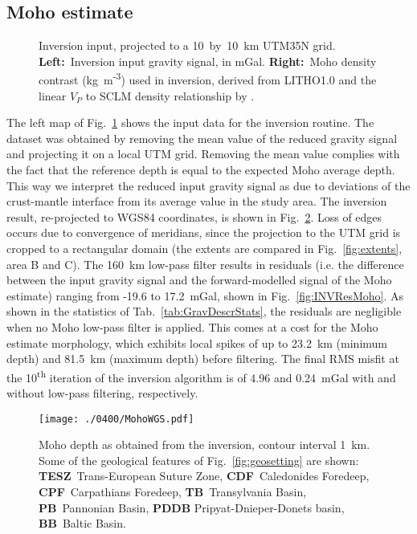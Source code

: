 {\subsection{Moho estimate}
\label{ss:Appl:DiscGravMoho}

\begin{figure}
	\begin{adjustbox}{center}
	\end{adjustbox}
	\caption{Inversion input, projected to a 10~by~10~km UTM35N grid. \textbf{Left:}~Inversion input gravity signal, in mGal. \textbf{Right:}~Moho density contrast (kg~m\textsuperscript{-3}) used in inversion, derived from {LITHO1.0} \parencite{Pasyanos2014} and the linear $V_P$ to SCLM density relationship by \textcite{Yegorova2015}.}
	\label{fig:INVinput}
\end{figure}

The left map of Fig.~\ref{fig:INVinput} shows the input data for the inversion routine.
The dataset was obtained by removing the mean value of the reduced gravity signal and projecting it on a local UTM grid.
Removing the mean value complies with the fact that the reference depth is equal to the expected Moho average depth.
This way we interpret the reduced input gravity signal as due to deviations of the crust-mantle interface from its average value in the study area.
The inversion result, re-projected to WGS84 coordinates, is shown in Fig.~\ref{fig:INVMoho}.
Loss of edges occurs due to convergence of meridians, since the projection to the UTM grid is cropped to a rectangular domain (the extents are compared in Fig.~\ref{fig:extents}, area B and C).
The 160~km low-pass filter results in residuals (i.e. the difference between the input gravity signal and the forward-modelled signal of the Moho estimate) ranging from -19.6 to 17.2~mGal, shown in Fig.~\ref{fig:INVResMoho}.
As shown in the statistics of Tab.~\ref{tab:GravDescrStats}, the residuals are negligible when no Moho low-pass filter is applied.
This comes at a cost for the Moho estimate morphology, which exhibits local spikes of up to 23.2~km (minimum depth) and 81.5~km (maximum depth) before filtering.
The final RMS misfit at the 10\textsuperscript{th} iteration of the inversion algorithm is of 4.96 and 0.24~mGal with and without low-pass filtering, respectively.

\begin{figure}
	\begin{adjustbox}{center}
	\texttt{[image: ./0400/MohoWGS.pdf]}
	\end{adjustbox}
	\caption{Moho depth as obtained from the inversion, contour interval 1~km. Some of the geological features of Fig.~\ref{fig:geosetting} are shown: \textbf{TESZ}~Trans-European Suture Zone, \textbf{CDF}~Caledonides Foredeep, \textbf{CPF}~Carpathians Foredeep, \textbf{TB}~Transylvania Basin, \textbf{PB}~Pannonian Basin, \textbf{PDDB} Pripyat-Dnieper-Donets basin, \textbf{BB}~Baltic Basin.}
	\label{fig:INVMoho}
\end{figure}

}
